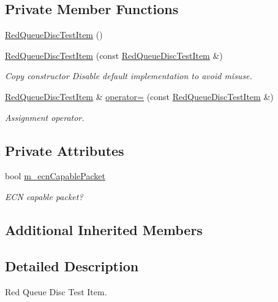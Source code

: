 \subsection*{Private Member Functions}
\begin{DoxyCompactItemize}
\item 
\hyperlink{classRedQueueDiscTestItem_aa87428a35104c54a742709875dd75fc9}{Red\+Queue\+Disc\+Test\+Item} ()
\item 
\hyperlink{classRedQueueDiscTestItem_aeb34732cb247604faafa90d068db2781}{Red\+Queue\+Disc\+Test\+Item} (const \hyperlink{classRedQueueDiscTestItem}{Red\+Queue\+Disc\+Test\+Item} \&)
\begin{DoxyCompactList}\small\item\em Copy constructor Disable default implementation to avoid misuse. \end{DoxyCompactList}\item 
\hyperlink{classRedQueueDiscTestItem}{Red\+Queue\+Disc\+Test\+Item} \& \hyperlink{classRedQueueDiscTestItem_a4ffe315456ab4ac6faec889e17209521}{operator=} (const \hyperlink{classRedQueueDiscTestItem}{Red\+Queue\+Disc\+Test\+Item} \&)
\begin{DoxyCompactList}\small\item\em Assignment operator. \end{DoxyCompactList}\end{DoxyCompactItemize}
\subsection*{Private Attributes}
\begin{DoxyCompactItemize}
\item 
bool \hyperlink{classRedQueueDiscTestItem_abeda20cb4e6e80f08432ab036cbec0af}{m\+\_\+ecn\+Capable\+Packet}
\begin{DoxyCompactList}\small\item\em E\+CN capable packet? \end{DoxyCompactList}\end{DoxyCompactItemize}
\subsection*{Additional Inherited Members}


\subsection{Detailed Description}
Red Queue Disc Test Item. 

